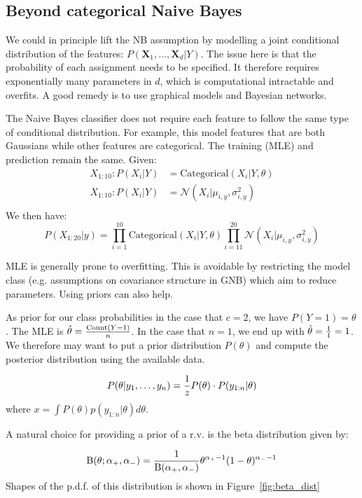 \documentclass[a4paper,10pt,twoside]{article}
\begin{document}
\subsection{Beyond categorical Naive Bayes}

We could in principle lift the NB assumption by modelling a joint conditional distribution of the features: $P(\mathbf{X}_1,\ldots,\mathbf{X}_d|Y)$. The issue here is that the probability of each assignment needs to be specified. It therefore requires exponentially many parameters in $d$, which is computational intractable and overfits. A good remedy is to use graphical models and Bayesian networks.

The Naive Bayes classifier does not require each feature to follow the same type of conditional distribution. For example, this model features that are both Gaussians while other features are categorical. The training (MLE) and prediction remain the same. Given:
\begin{align*}
  X_{1:10}:P(X_i|Y)&=\text{Categorical}(X_i|Y,\theta)\\
  X_{1:10}:P(X_i|Y)&=\mathcal{N}(X_i|\mu_{i,y},\sigma^2_{i,y})\\
\end{align*}
We then have:
\begin{equation*}
  P(X_{1:20}|y)=\prod_{i=1}^{10}\text{Categorical}(X_i|Y,\theta)\prod_{i=11}^{20}\mathcal{N}(X_i|\mu_{i,y},\sigma^2_{i,y})
\end{equation*}

MLE is generally prone to overfitting. This is avoidable by restricting the model class (e.g. assumptions on covariance structure in GNB) which aim to reduce parameters. Using priors can also help.

As prior for our class probabilities in the case that $c=2$, we have $P(Y=1)=\theta$. The MLE is $\hat{\theta}={\text{Count}(Y=1)\over n}$. In the case that $n=1$, we end up with $\hat{\theta}={1\over 1} =1$. We therefore may want to put a prior distribution $P(\theta)$ and compute the posterior distribution using the available data.

\begin{equation*}
  P(\theta|y_1,\ldots,y_n)={1\over z}P(\theta)\cdot P(y_{1:n}|\theta)
\end{equation*}
where $x=\int P(\theta)p(y_{1:n}|\theta)d\theta$.

A natural choice for providing a prior of a r.v. is the beta distribution given by:

\begin{equation*}
  \mathrm {B} (\theta;\alpha_+,\alpha_-)={1\over\mathrm{B}(\alpha_+,\alpha_-)}\theta^{\alpha_+-1}(1-\theta)^{\alpha_--1}
\end{equation*}
Shapes of the p.d.f. of this distribution is shown in Figure~\ref{fig:beta_dist}
\end{document}
